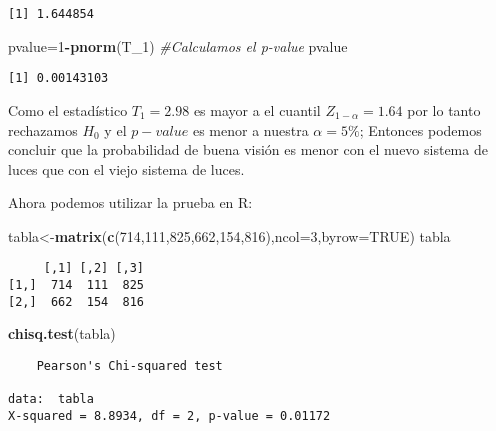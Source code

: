 \documentclass[
  a4paper,
  oneside,
  openany]{book}
\newenvironment{Shaded}{\begin{snugshade}}{\end{snugshade}}
\newcommand{\CommentTok}[1]{\textcolor[rgb]{0.56,0.35,0.01}{\textit{#1}}}
\newcommand{\DataTypeTok}[1]{\textcolor[rgb]{0.13,0.29,0.53}{#1}}
\newcommand{\DecValTok}[1]{\textcolor[rgb]{0.00,0.00,0.81}{#1}}
\newcommand{\KeywordTok}[1]{\textcolor[rgb]{0.13,0.29,0.53}{\textbf{#1}}}
\newcommand{\NormalTok}[1]{#1}
\newcommand{\OperatorTok}[1]{\textcolor[rgb]{0.81,0.36,0.00}{\textbf{#1}}}
\newcommand{\OtherTok}[1]{\textcolor[rgb]{0.56,0.35,0.01}{#1}}
\begin{document}
\begin{verbatim}
[1] 1.644854
\end{verbatim}

\begin{Shaded}
\begin{Highlighting}[]
\NormalTok{pvalue=}\DecValTok{1}\OperatorTok{{-}}\KeywordTok{pnorm}\NormalTok{(T\_}\DecValTok{1}\NormalTok{)  }\CommentTok{\#Calculamos el p{-}value}
\NormalTok{pvalue}
\end{Highlighting}
\end{Shaded}

\begin{verbatim}
[1] 0.00143103
\end{verbatim}

Como el estadístico \(T_1=2.98\) es mayor a el cuantil \(Z_{1-\alpha}=1.64\) por lo tanto rechazamos \(H_0\)
y el \(p-value\) es menor a nuestra \(\alpha=5\%\); Entonces podemos concluir que la probabilidad de buena visión es menor con el nuevo sistema de luces que con el viejo sistema de luces.

Ahora podemos utilizar la prueba en R:

\begin{Shaded}
\begin{Highlighting}[]
\NormalTok{tabla\textless{}{-}}\KeywordTok{matrix}\NormalTok{(}\KeywordTok{c}\NormalTok{(}\DecValTok{714}\NormalTok{,}\DecValTok{111}\NormalTok{,}\DecValTok{825}\NormalTok{,}\DecValTok{662}\NormalTok{,}\DecValTok{154}\NormalTok{,}\DecValTok{816}\NormalTok{),}\DataTypeTok{ncol=}\DecValTok{3}\NormalTok{,}\DataTypeTok{byrow=}\OtherTok{TRUE}\NormalTok{)}
\NormalTok{tabla}
\end{Highlighting}
\end{Shaded}

\begin{verbatim}
     [,1] [,2] [,3]
[1,]  714  111  825
[2,]  662  154  816
\end{verbatim}

\begin{Shaded}
\begin{Highlighting}[]
\KeywordTok{chisq.test}\NormalTok{(tabla)}
\end{Highlighting}
\end{Shaded}

\begin{verbatim}
    Pearson's Chi-squared test

data:  tabla
X-squared = 8.8934, df = 2, p-value = 0.01172
\end{verbatim}
\end{document}
